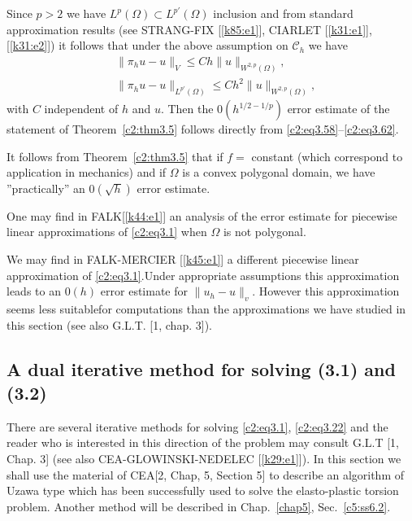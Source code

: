 Since $p >2$ we have $L^p (\Omega) \subset L^{p'}(\Omega)$ inclusion
and from standard approximation results (see STRANG-FIX [\ref{k85:e1}], CIARLET
[\ref{k31:e1}], [\ref{k31:e2}]) it follows that under the above assumption on
$\mathscr{C}_h$ we have 
\begin{align*}
& \parallel \pi_h u-u\parallel_V \leq C h \parallel u\parallel_{W^{2,
      p}(\Omega)},\tag{3.61}\label{c2:eq3.61}\\ 
& \parallel \pi_hu-u\parallel_{L^{p'}(\Omega)} \leq C h^2 \parallel u\parallel_{W^{2, p}(\Omega)},
  \tag{3.62}\label{c2:eq3.62} 
\end{align*}
with $C$ independent of $h$ and $u$. Then the $0(h^{1/2-1/p})$ error
estimate of the statement of Theorem~\ref{c2:thm3.5} follows directly
from \eqref{c2:eq3.58}--\eqref{c2:eq3.62}. 

\begin{remark}\label{c2:rem3.9}%
 It  follows from Theorem~\ref{c2:thm3.5} that if $f =$ constant
 (which correspond  to application in mechanics) and if $\Omega$ is a
 convex polygonal  domain, we have ''practically'' an $0(\sqrt{h})$
 error estimate.  
\end{remark}

\begin{remark}\label{c2:rem3.10}%
One may find in FALK[\ref{k44:e1}] an analysis  of  the error estimate for
piecewise linear approximations of \eqref{c2:eq3.1} when $\Omega$ is
not polygonal.  
\end{remark}

\begin{remark}\label{c2:rem3.11}%
We may find in FALK-MERCIER [\ref{k45:e1}] a different  piecewise linear
approximation of \eqref{c2:eq3.1}.Under appropriate assumptions this
approximation leads to an $0 (h)$ error estimate for
$\parallel u_h-u\parallel_v$. However this  approximation seems less  suitable\pageoriginale  for
computations than the approximations we have studied in this section
(see also G.L.T. [1, chap. 3]). 
\end{remark}

\subsection{A dual iterative method for solving (3.1) and
  (3.2)}\label{c2:ss3.8} %

There are several iterative methods for solving \eqref{c2:eq3.1},
\eqref{c2:eq3.22} and the reader who is interested in this direction
of the problem may consult 
G.L.T [1, Chap. 3] (see also CEA-GLOWINSKI-NEDELEC [\ref{k29:e1}]). In this
section we shall use the material of CEA[2, Chap, 5, Section 5] to
describe an algorithm of Uzawa type which has been successfully used to
solve the elasto-plastic torsion problem. Another method will be
described in Chap.~\ref{chap5},  Sec.~\ref{c5:ss6.2}.  

